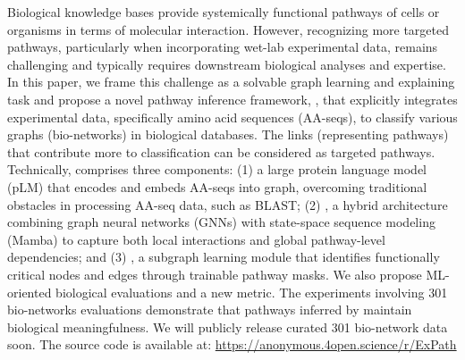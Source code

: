 Biological knowledge bases provide systemically functional pathways of cells or organisms in terms of molecular interaction.
However, recognizing more targeted pathways, particularly when incorporating wet-lab experimental data, remains challenging and typically requires downstream biological analyses and expertise.
In this paper, we frame this challenge as a solvable graph learning and explaining task and propose a novel pathway inference framework, \method, that explicitly integrates experimental data, specifically amino acid sequences (AA-seqs), to classify various graphs (bio-networks) in biological databases.
The links (representing pathways) that contribute more to classification can be considered as targeted pathways.
Technically, \method comprises three components: (1) a large protein language model (pLM) that encodes and embeds AA-seqs into graph, overcoming traditional obstacles in processing AA-seq data, such as BLAST; (2) \classifier, a hybrid architecture combining graph neural networks (GNNs) with state-space sequence modeling (Mamba) to capture both local interactions and global pathway-level dependencies; 
and (3) \explainer, a subgraph learning module that identifies functionally critical nodes and edges through trainable pathway masks.  
We also propose ML-oriented biological evaluations and a new metric.
The experiments involving 301 bio-networks evaluations demonstrate that pathways inferred by \method maintain biological meaningfulness.
We will publicly release curated 301 bio-network data soon.
The source code is available at:
\url{https://anonymous.4open.science/r/ExPath}




